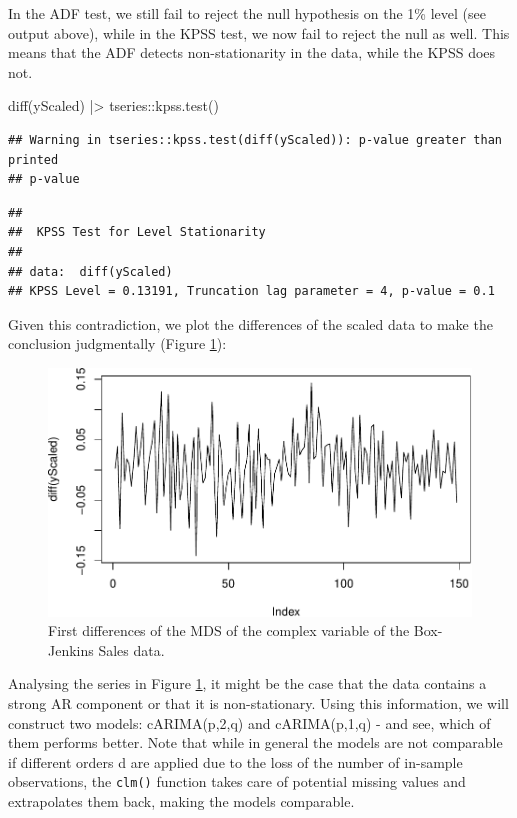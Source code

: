 \documentclass[
]{book}
\newenvironment{Shaded}{\begin{snugshade}}{\end{snugshade}}
\newcommand{\FunctionTok}[1]{\textcolor[rgb]{0.00,0.00,0.00}{#1}}
\newcommand{\NormalTok}[1]{#1}
\newcommand{\SpecialCharTok}[1]{\textcolor[rgb]{0.00,0.00,0.00}{#1}}
\begin{document}
In the ADF test, we still fail to reject the null hypothesis on the 1\% level (see output above), while in the KPSS test, we now fail to reject the null as well. This means that the ADF detects non-stationarity in the data, while the KPSS does not.

\begin{Shaded}
\begin{Highlighting}[]
\FunctionTok{diff}\NormalTok{(yScaled) }\SpecialCharTok{|\textgreater{}}
\NormalTok{    tseries}\SpecialCharTok{::}\FunctionTok{kpss.test}\NormalTok{()}
\end{Highlighting}
\end{Shaded}

\begin{verbatim}
## Warning in tseries::kpss.test(diff(yScaled)): p-value greater than printed
## p-value
\end{verbatim}

\begin{verbatim}
## 
##  KPSS Test for Level Stationarity
## 
## data:  diff(yScaled)
## KPSS Level = 0.13191, Truncation lag parameter = 4, p-value = 0.1
\end{verbatim}

Given this contradiction, we plot the differences of the scaled data to make the conclusion judgmentally (Figure \ref{fig:BJSalesComplexDiffs}):

\begin{figure}
\centering
\includegraphics{Svetunkov---Svetunkov---Complex-Valued-Econometrics_files/figure-latex/BJSalesComplexDiffs-1.pdf}
\caption{\label{fig:BJSalesComplexDiffs}First differences of the MDS of the complex variable of the Box-Jenkins Sales data.}
\end{figure}

Analysing the series in Figure \ref{fig:BJSalesComplexDiffs}, it might be the case that the data contains a strong AR component or that it is non-stationary. Using this information, we will construct two models: cARIMA(p,2,q) and cARIMA(p,1,q) - and see, which of them performs better. Note that while in general the models are not comparable if different orders d are applied due to the loss of the number of in-sample observations, the \texttt{clm()} function takes care of potential missing values and extrapolates them back, making the models comparable.
\end{document}
